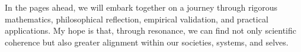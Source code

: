 In the pages ahead, we will embark together on a journey through rigorous mathematics, philosophical reflection, empirical validation, and practical applications. My hope is that, through resonance, we can find not only scientific coherence but also greater alignment within our societies, systems, and selves.




\frontmatter%
